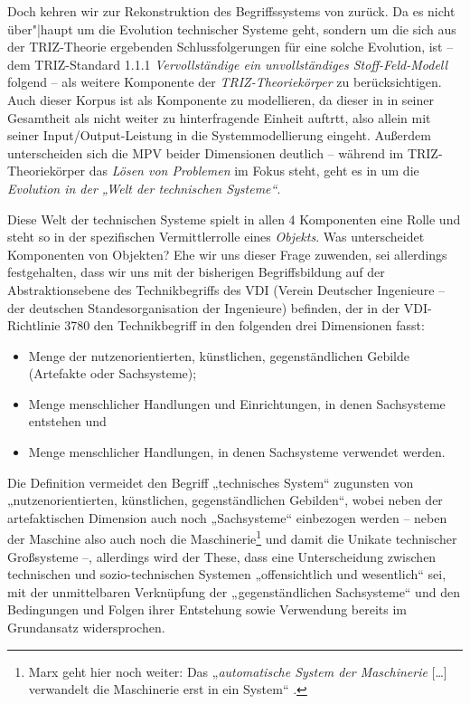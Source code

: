 \documentclass[11pt,a4paper]{article}
\begin{document}
Doch kehren wir zur Rekonstruktion des Begriffssystems von \cite{TESE2018}
zurück.  Da es nicht über"|haupt um die Evolution technischer Systeme geht,
sondern um die sich aus der TRIZ-Theorie ergebenden Schlussfolgerungen für
eine solche Evolution, ist -- dem TRIZ-Standard 1.1.1 \emph{Vervollständige
  ein unvollständiges Stoff-Feld-Modell} folgend -- als weitere Komponente der
\emph{TRIZ-Theoriekörper} zu berücksichtigen. Auch dieser Korpus ist als
Komponente zu modellieren, da dieser in \cite{TESE2018} in seiner Gesamtheit
als nicht weiter zu hinterfragende Einheit auftrtt, also allein mit seiner
Input/Output-Leistung in die Systemmodellierung eingeht.  Außerdem
unterscheiden sich die MPV beider Dimensionen deutlich -- während im
TRIZ-Theoriekörper das \emph{Lösen von Problemen} im Fokus steht, geht es in
\cite{TESE2018} um die \emph{Evolution in der „Welt der technischen Systeme“}.

Diese Welt der technischen Systeme spielt in allen 4 Komponenten eine Rolle
und steht so in der spezifischen Vermittlerrolle eines \emph{Objekts}.  Was
unterscheidet Komponenten von Objekten? Ehe wir uns dieser Frage zuwenden, sei
allerdings festgehalten, dass wir uns mit der bisherigen Begriffsbildung auf
der Abstraktionsebene des Technikbegriffs des VDI (Verein Deutscher Ingenieure
-- der deutschen Standesorganisation der Ingenieure) befinden, der in der
VDI-Richtlinie 3780 den Technikbegriff in den folgenden drei Dimensionen
fasst:
\begin{itemize}
\item Menge der nutzenorientierten, künstlichen, gegenständlichen Gebilde
  (Artefakte oder Sachsysteme);
\item Menge menschlicher Handlungen und Einrichtungen, in denen Sachsysteme
  entstehen und
\item Menge menschlicher Handlungen, in denen Sachsysteme verwendet werden.
\end{itemize}
Die Definition vermeidet den Begriff „technisches System“ zugunsten von
„nutzenorientierten, künstlichen, gegenständlichen Gebilden“, wobei neben der
artefaktischen Dimension auch noch „Sachsysteme“ einbezogen werden -- neben
der Maschine also auch noch die Maschinerie\footnote{Marx geht hier noch
  weiter: Das „\emph{automatische System der Maschinerie} [\ldots] verwandelt
  die Maschinerie erst in ein System“ \cite[S. 584]{MEW42}.} und damit die
Unikate technischer Großsysteme --, allerdings wird der These, dass eine
Unterscheidung zwischen technischen und sozio-technischen Systemen
„offensichtlich und wesentlich“ sei, mit der unmittelbaren Verknüpfung der
„gegenständlichen Sachsysteme“ und den Bedingungen und Folgen ihrer Entstehung
sowie Verwendung bereits im Grundansatz widersprochen.
\end{document}
